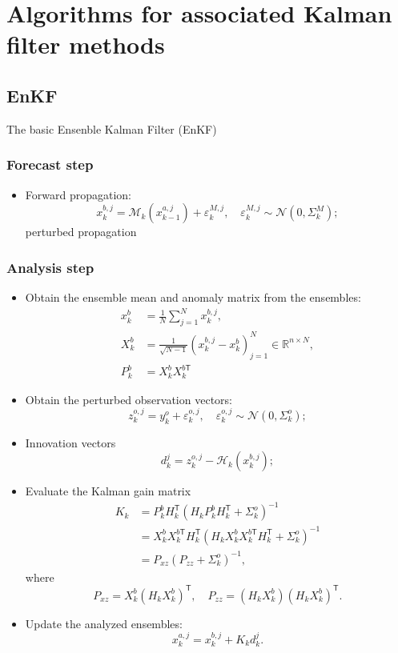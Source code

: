 \documentclass{article}
\newcommand{\trans}{\mathsf{T}}
\begin{document}
\section{Algorithms for associated Kalman filter methods}\label{tab:kalman_filter_methods}
\subsection{EnKF}
The basic Ensenble Kalman Filter (EnKF)
\subsubsection{Forecast step}
\begin{itemize}
	\item Forward propagation:
	      $$
		      x_k^{b,j}=\mathcal{M}_k(x_{k-1}^{a,j})+\varepsilon_k^{M,j},\quad \varepsilon_k^{M,j}\sim\mathcal{N}(0,\Sigma_k^M);
	      $$
	      perturbed propagation

\end{itemize}
\subsubsection{Analysis step}
\begin{itemize}
	\item Obtain the ensemble mean and anomaly matrix from the ensembles:
	      \begin{align*}
		      x_k^b & = \frac1N\sum_{j=1}^Nx_k^{b,j},                                           \\
		      X_k^b & = \frac1{\sqrt{N-1}}(x_k^{b,j} - x_k^b)_{j=1}^N\in\mathbb{R}^{n\times N}, \\
		      P_k^b & = X_k^bX_k^{b\trans}
	      \end{align*}
	\item Obtain the perturbed observation vectors:
	      $$
		      z_k^{o,j} = y_k^o + \varepsilon_k^{o,j},\quad\varepsilon_k^{o,j}\sim\mathcal{N}(0,\Sigma_k^o);
	      $$
	\item Innovation vectors
	      $$
		      d_k^j = z_k^{o,j} - \mathcal{H}_k(x_k^{b,j});
	      $$
	\item Evaluate the Kalman gain matrix
	      \begin{align*}
		      K_k & = P_k^bH_k^\trans (H_kP_k^bH_k^\trans +\Sigma_k^o)^{-1}                           \\
		          & = X_k^bX_k^{b\trans}H_k^\trans (H_kX_k^bX_k^{b\trans}H_k^\trans +\Sigma_k^o)^{-1} \\
		          & = P_{xz}(P_{zz}+\Sigma_k^o)^{-1},
	      \end{align*}
	      where
	      $$
		      P_{xz} = X_k^b(H_kX_k^b)^\trans ,\quad P_{zz} = (H_kX_k^b)(H_kX_k^b)^\trans .
	      $$
	\item Update the analyzed ensembles:
	      $$
		      x_k^{a,j}=x_k^{b,j}+K_kd_k^j.
	      $$
\end{itemize}
\end{document}
